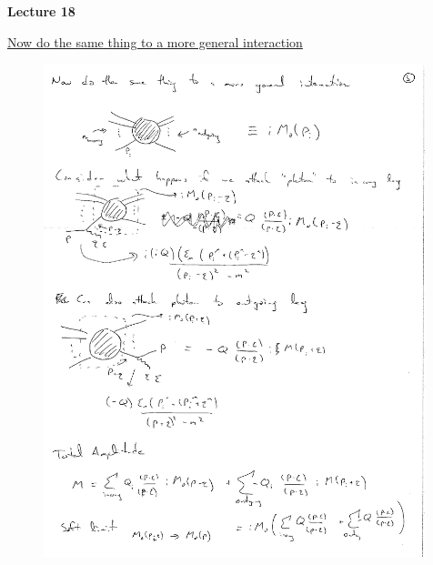 
\usepackage{braket}
\usepackage{bbm}
\usepackage{relsize}
\usepackage{tcolorbox}



\usepackage{cancel}

\usepackage{fancyhdr}

\fancyhf{}


\thispagestyle{fancy}

\begin{center}
{\huge \textbf{Lecture 18}}
\end{center}

{\fontsize{14}{16}\selectfont

\underline{Now do the same thing to a more general interaction}


\begin{figure}[h]
\includegraphics[width=0.99\textwidth]{./generalScattering.pdf}
\end{figure}

}
